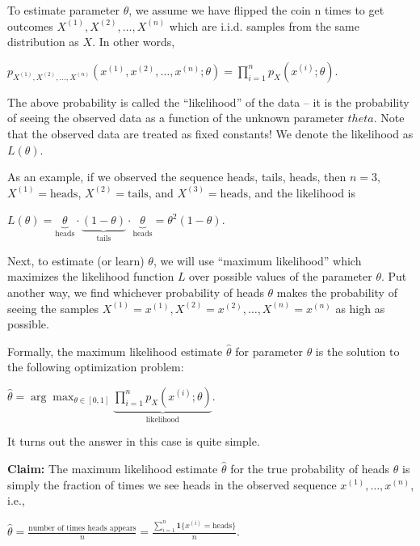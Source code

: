 \documentclass[6008notes.tex]{subfiles}
\begin{document}
To estimate parameter $\theta$, we assume we have flipped the coin n times to get outcomes $X^{(1)},X^{(2)},\dots ,X^{(n)}$ which are i.i.d. samples from the same distribution as $X$. In other words,

{\centering$p_{X^{(1)},X^{(2)},\dots ,X^{(n)}}(x^{(1)},x^{(2)},\dots ,x^{(n)};\theta )=\prod _{i=1}^{n}p_{X}(x^{(i)};\theta ).$ \par}
 
The above probability is called the ``likelihood'' of the data -- it is the probability of seeing the observed data as a function of the unknown parameter $theta$. Note that the observed data are treated as fixed constants! We denote the likelihood as $L(\theta)$.

As an example, if we observed the sequence heads, tails, heads, then $n=3$, $X^{(1)} = \text {heads}$, $X^{(2)} = \text {tails}$, and $X^{(3)} = \text {heads}$, and the likelihood is

{\centering$L(\theta ) = \underbrace{\theta }_{\text {heads}} \cdot \underbrace{(1 - \theta )}_{\text {tails}} \cdot \underbrace{\theta }_{\text {heads}} = \theta ^2 (1 - \theta ).$ \par}
 
Next, to estimate (or learn) $\theta$, we will use ``maximum likelihood'' which maximizes the likelihood function $L$ over possible values of the parameter $\theta$. Put another way, we find whichever probability of heads $\theta$ makes the probability of seeing the samples $X^{(1)}=x^{(1)},X^{(2)}=x^{(2)},\dots ,X^{(n)}=x^{(n)}$ as high as possible.

Formally, the maximum likelihood estimate $\widehat{\theta }$ for parameter $\theta$ is the solution to the following optimization problem:

{\centering$\widehat{\theta }=\arg \max _{\theta \in [0,1]}\underbrace{\prod _{i=1}^{n}p_{X}(x^{(i)};\theta )}_{\text {likelihood}}.$ \par}
 
It turns out the answer in this case is quite simple.

\textbf{Claim:} The maximum likelihood estimate $\widehat{\theta }$ for the true probability of heads $\theta$ is simply the fraction of times we see heads in the observed sequence $x^{(1)},\dots ,x^{(n)}$, i.e.,

{\centering$\widehat{\theta }=\frac{\text {number of times heads appears}}{n}=\frac{\sum _{i=1}^{n}\mathbf{1}\{ x^{(i)}=\text {heads}\} }{n}.$ \par}
 
\end{document}
